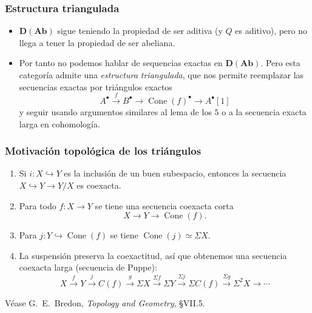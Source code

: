 \documentclass[12pt]{beamer}
\begin{document}
\begin{frame}
  \frametitle{Estructura triangulada}
  \begin{itemize}
    \item $\mathbf{D}(\mathbf{Ab})$ sigue teniendo la propiedad de ser aditiva (y $Q$ es aditivo), pero no llega a tener la propiedad de ser abeliana.
      \pause
    \item Por tanto no podemos hablar de sequencias exactas en $\mathbf{D}(\mathbf{Ab})$.
      Pero esta categoría admite una \textit{estructura triangulada}, que nos permite reemplazar las secuencias exactas por triángulos exactos
      \[ A^{\bullet} \xrightarrow{f} B^{\bullet} \to \operatorname{Cone}(f)^{\bullet} \to A^{\bullet}[1] \]
      y seguir usando argumentos similares al lema de los $5$ o a la secuencia exacta larga en cohomología.
  \end{itemize}
\end{frame}

\begin{frame}
  \frametitle{Motivación topológica de los triángulos}
  \begin{enumerate}
    \item Si $i \colon X \hookrightarrow Y$ es la inclusión de un buen subespacio, entonces la secuencia $X \hookrightarrow Y \to Y/X$ es coexacta.
      \pause
    \item Para todo $f \colon X \to Y$ se tiene una secuencia coexacta corta
      \[ X \to Y \to \operatorname{Cone}(f). \]
      \pause
    \item Para $j \colon Y \hookrightarrow \operatorname{Cone}(f)$ se tiene $\operatorname{Cone}(j) \simeq \Sigma X$.
      \pause
    \item La suspensión preserva la coexactitud, así que obtenemos una secuencia coexacta larga (secuencia de Puppe):
      \[ X \xrightarrow{f} Y \xrightarrow{j} C(f) \xrightarrow{g} \Sigma X \xrightarrow{\Sigma f} \Sigma Y \xrightarrow{\Sigma j} \Sigma C(f) \xrightarrow{\Sigma g} \Sigma^{2} X \to \cdots \]
  \end{enumerate}
  Véase G.~E.~Bredon, \textit{Topology and Geometry}, \S VII.5.
\end{frame}
\end{document}
